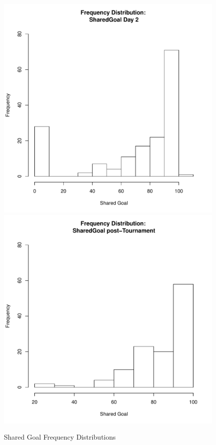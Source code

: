 \documentclass[12pt]{report}
\begin{document}
{\begin{figure}[htbp]
  \includegraphics[scale =.4]{../images/distSharedGoalDay2.pdf}
  \includegraphics[scale =.4]{../images/distSharedGoalPost.pdf}
  \caption{Shared Goal Frequency Distributions}
  \label{fig:sharedGoalDist}
\end{figure}


}
\end{document}
